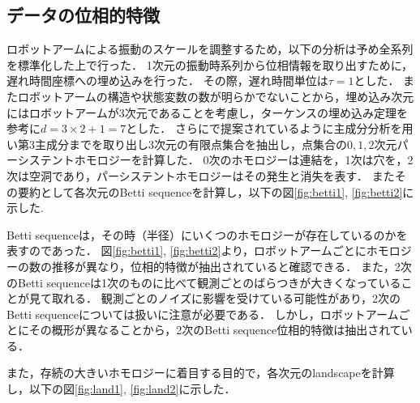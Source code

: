\documentclass{jarticle}
\begin{document}
\subsection{データの位相的特徴}
ロボットアームによる振動のスケールを調整するため，以下の分析は予め全系列を標準化した上で行った．
1次元の振動時系列から位相情報を取り出すために，遅れ時間座標への埋め込みを行った．
その際，遅れ時間単位は$\tau = 1$とした．
またロボットアームの構造や状態変数の数が明らかでないことから，埋め込み次元にはロボットアームが3次元であることを考慮し，ターケンスの埋め込み定理\cite{Takens1981}を参考に$d = 3\times2 + 1 = 7$とした．
さらに\cite{Truong2017}で提案されているように主成分分析を用い第3主成分までを取り出し3次元の有限点集合を抽出し，点集合の$0,1,2$次元パーシステントホモロジーを計算した．
0次のホモロジーは連結を，1次は穴を，2次は空洞であり，パーシステントホモロジーはその発生と消失を表す．
またその要約として各次元のBetti sequenceを計算し，以下の図\ref{fig:betti1}, \ref{fig:betti2}に示した.

Betti sequenceは，その時（半径）にいくつのホモロジーが存在しているのかを表すのであった．
図\ref{fig:betti1}, \ref{fig:betti2}より，ロボットアームごとにホモロジーの数の推移が異なり，位相的特徴が抽出されていると確認できる．
また，2次のBetti sequenceは1次のものに比べて観測ごとのばらつきが大きくなっていることが見て取れる．
観測ごとのノイズに影響を受けている可能性があり，2次のBetti sequenceについては扱いに注意が必要である．
しかし，ロボットアームごとにその概形が異なることから，2次のBetti sequence位相的特徴は抽出されている．

また，存続の大きいホモロジーに着目する目的で，各次元のlandscapeを計算し，以下の図\ref{fig:land1}, \ref{fig:land2}に示した．
\end{document}
